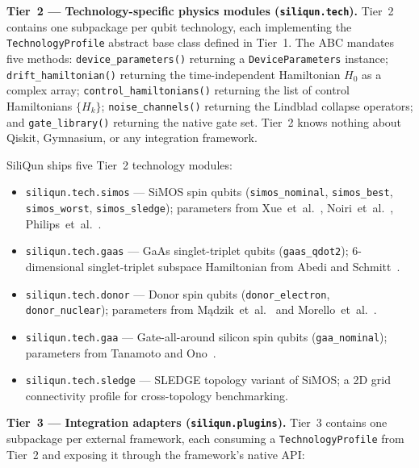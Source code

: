 \textbf{Tier~2 — Technology-specific physics modules
(\texttt{siliqun.tech}).}
Tier~2 contains one subpackage per qubit technology, each implementing
the \texttt{TechnologyProfile} abstract base class defined in Tier~1.
The ABC mandates five methods: \texttt{device\_parameters()} returning
a \texttt{DeviceParameters} instance; \texttt{drift\_hamiltonian()}
returning the time-independent Hamiltonian $H_0$ as a complex array;
\texttt{control\_hamiltonians()} returning the list of control
Hamiltonians $\{H_k\}$; \texttt{noise\_channels()} returning the
Lindblad collapse operators; and \texttt{gate\_library()} returning the
native gate set.
Tier~2 knows nothing about Qiskit, Gymnasium, or any integration
framework.

SiliQun ships five Tier~2 technology modules:

\begin{itemize}
  \item \texttt{siliqun.tech.simos} — SiMOS spin qubits
    (\texttt{simos\_nominal}, \texttt{simos\_best}, \texttt{simos\_worst},
    \texttt{simos\_sledge}); parameters from
    Xue~et~al.~\cite{Xue2022}, Noiri~et~al.~\cite{Noiri2022},
    Philips~et~al.~\cite{Philips2022}.
  \item \texttt{siliqun.tech.gaas} — GaAs singlet-triplet qubits
    (\texttt{gaas\_qdot2}); 6-dimensional singlet-triplet subspace
    Hamiltonian from Abedi and Schmitt~\cite{Abedi2025}.
  \item \texttt{siliqun.tech.donor} — Donor spin qubits
    (\texttt{donor\_electron}, \texttt{donor\_nuclear}); parameters
    from M\k{a}dzik~et~al.~\cite{Madzik2022} and
    Morello~et~al.~\cite{Morello2020}.
  \item \texttt{siliqun.tech.gaa} — Gate-all-around silicon spin qubits
    (\texttt{gaa\_nominal}); parameters from Tanamoto and
    Ono~\cite{Tanamoto2025}.
  \item \texttt{siliqun.tech.sledge} — SLEDGE topology variant of SiMOS;
    a 2D grid connectivity profile for cross-topology benchmarking.
\end{itemize}

\textbf{Tier~3 — Integration adapters (\texttt{siliqun.plugins}).}
Tier~3 contains one subpackage per external framework, each consuming
a \texttt{TechnologyProfile} from Tier~2 and exposing it through the
framework's native API:

